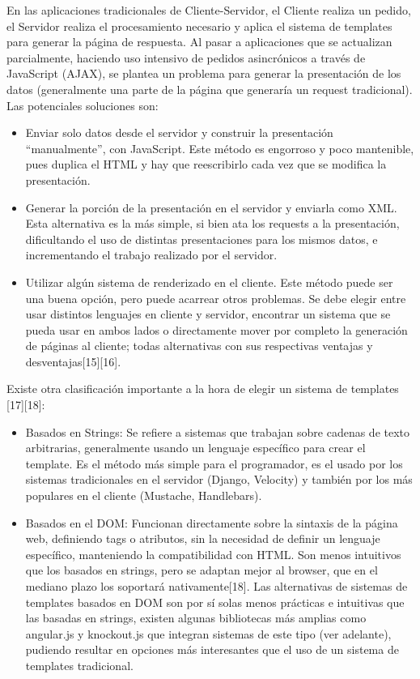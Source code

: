 \documentclass[doc,helv,longtable]{article}
\begin{document}
En las aplicaciones tradicionales de Cliente-Servidor, el Cliente realiza un pedido, el Servidor realiza el procesamiento necesario y aplica el sistema de templates para generar la página de respuesta. Al pasar a aplicaciones que se actualizan parcialmente, haciendo uso intensivo de pedidos asincrónicos a través de JavaScript (AJAX), se plantea un problema para generar la presentación de los datos (generalmente una parte de la página que generaría un request tradicional). Las potenciales soluciones son:
\begin{itemize}
\item  Enviar solo datos desde el servidor y construir la presentación “manualmente”, con JavaScript. Este método es engorroso y poco mantenible, pues duplica el HTML y hay que reescribirlo cada vez que se modifica la presentación.
\item  Generar la porción de la presentación en el servidor y enviarla como XML. Esta alternativa es la más simple, si bien ata los requests a la presentación, dificultando el uso de distintas presentaciones para los mismos datos, e incrementando el trabajo realizado por el servidor.
\item  Utilizar algún sistema de renderizado en el cliente. Este método puede ser una buena opción, pero puede acarrear otros problemas. Se debe elegir entre usar distintos lenguajes en cliente y servidor, encontrar un sistema que se pueda usar en ambos lados o directamente mover por completo la generación de páginas al cliente; todas alternativas con sus respectivas ventajas y desventajas[15][16].

\end{itemize}


Existe otra clasificación importante a la hora de elegir un sistema de templates [17][18]:
\begin{itemize}
\item  Basados en Strings: Se refiere a sistemas que trabajan sobre cadenas de texto arbitrarias, generalmente usando un lenguaje específico para crear el template. Es el método más simple para el programador, es el usado por los sistemas tradicionales en el servidor (Django, Velocity) y también por los más populares en el cliente (Mustache, Handlebars).
\item  Basados en el DOM: Funcionan directamente sobre la sintaxis de la página web, definiendo tags o atributos, sin la necesidad de definir un lenguaje específico, manteniendo la compatibilidad con HTML. Son menos intuitivos que los basados en strings, pero se adaptan mejor al browser, que en el mediano plazo los soportará nativamente[18]. Las alternativas de sistemas de templates basados en DOM son por sí solas menos prácticas e intuitivas que las basadas en strings, existen algunas bibliotecas más amplias como angular.js y knockout.js que integran sistemas de este tipo (ver adelante), pudiendo resultar en opciones más interesantes que el uso de un sistema de templates tradicional.

\end{itemize}
\end{document}
